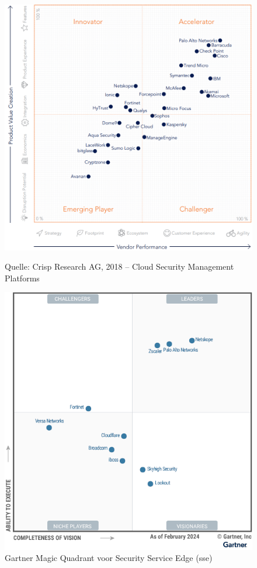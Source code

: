 \begin{figure}[H]
    \centering
    \scriptsize
    \begin{minipage}{0.48\textwidth}
        \centering
        \includegraphics[width=\textwidth]{img/netskopeinnovator.png}
        \caption{Quelle: Crisp Research AG, 2018 -- Cloud Security Management Platforms \autocite{Hille2018}}
        \label{fig:netskope}
    \end{minipage}
    \hfill
    \begin{minipage}{0.48\textwidth}
        \centering
        \includegraphics[width=\textwidth]{img/netskope2024.png}
        \caption{Gartner Magic Quadrant voor Security Service Edge (\gls{sse}) \autocite{Gartner2024}}
        \label{fig:netskope2024}
    \end{minipage}
\end{figure}



